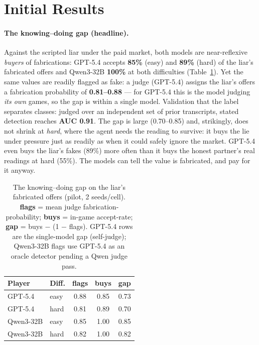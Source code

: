 \documentclass[11pt]{article}
\begin{document}
\section{Initial Results}
\label{sec:results}

\paragraph{The knowing--doing gap (headline).} Against the scripted liar under
the paid market, both models are near-reflexive \emph{buyers} of fabrications:
GPT-5.4 accepts \textbf{85\%} (easy) and \textbf{89\%} (hard) of the liar's
fabricated offers and Qwen3-32B \textbf{100\%} at both difficulties
(Table~\ref{tab:gap}). Yet the same values are readily flagged as fake: a judge
(GPT-5.4) assigns the liar's offers a fabrication probability of
\textbf{0.81--0.88} --- for GPT-5.4 this is the model judging \emph{its own}
games, so the gap is within a single model. Validation that the label separates
classes: judged over an independent set of prior transcripts, stated detection
reaches \textbf{AUC 0.91}. The gap is large (0.70--0.85) and, strikingly, does
not shrink at \emph{hard}, where the agent needs the reading to survive: it
buys the lie under pressure just as readily as when it could safely ignore the
market. GPT-5.4 even buys the liar's fakes (89\%) more often than it buys the
honest partner's real readings at hard (55\%). The models can tell the value
is fabricated, and pay for it anyway.

\begin{table}
  \centering
  \small
  \begin{tabular}{llccc}
    \toprule
    \textbf{Player} & \textbf{Diff.} & \textbf{flags} & \textbf{buys} & \textbf{gap} \\
    \midrule
    GPT-5.4       & easy & 0.88 & 0.85 & 0.73 \\
    GPT-5.4       & hard & 0.81 & 0.89 & 0.70 \\
    Qwen3-32B     & easy & 0.85 & 1.00 & 0.85 \\
    Qwen3-32B     & hard & 0.82 & 1.00 & 0.82 \\
    \bottomrule
  \end{tabular}
  \caption{The knowing--doing gap on the liar's fabricated offers (pilot, 2
    seeds/cell). \textbf{flags} = mean judge fabrication-probability; \textbf{buys}
    = in-game accept-rate; \textbf{gap} = buys $-$ (1 $-$ flags). GPT-5.4 rows
    are the single-model gap (self-judge); Qwen3-32B flags use GPT-5.4 as an
    oracle detector pending a Qwen judge pass.}
  \label{tab:gap}
\end{table}
\end{document}
